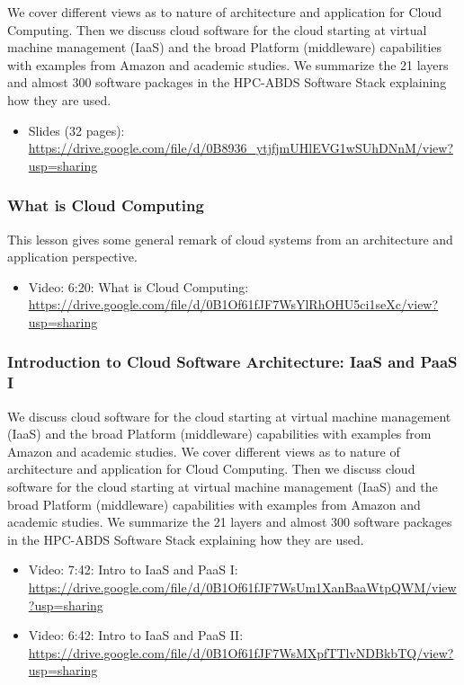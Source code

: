 We cover different views as to nature of architecture and application
for Cloud Computing. Then we discuss cloud software for the cloud
starting at virtual machine management (IaaS) and the broad Platform
(middleware) capabilities with examples from Amazon and academic
studies. We summarize the 21 layers and almost 300 software packages in
the HPC-ABDS Software Stack explaining how they are used.

\begin{itemize}
\item
  Slides (32 pages):
  \url{https://drive.google.com/file/d/0B8936_ytjfjmUHlEVG1wSUhDNnM/view?usp=sharing}
\end{itemize}

\subsubsection{What is Cloud Computing}\label{what-is-cloud-computing}

This lesson gives some general remark of cloud systems from an
architecture and application perspective.

\begin{itemize}
\tightlist
\item
  Video: 6:20: What is Cloud Computing:
  \url{https://drive.google.com/file/d/0B1Of61fJF7WsYlRhOHU5ci1seXc/view?usp=sharing}
\end{itemize}

\subsubsection{Introduction to Cloud Software Architecture: IaaS and  PaaS I}

We discuss cloud software for the cloud starting at virtual machine
management (IaaS) and the broad Platform (middleware) capabilities with
examples from Amazon and academic studies. We cover different views as
to nature of architecture and application for Cloud Computing. Then we
discuss cloud software for the cloud starting at virtual machine
management (IaaS) and the broad Platform (middleware) capabilities with
examples from Amazon and academic studies. We summarize the 21 layers
and almost 300 software packages in the HPC-ABDS Software Stack
explaining how they are used.

\begin{itemize}
\item
  Video: 7:42: Intro to IaaS and PaaS I:
  \url{https://drive.google.com/file/d/0B1Of61fJF7WsUm1XanBaaWtpQWM/view?usp=sharing}
\item
  Video: 6:42: Intro to IaaS and PaaS II:
  \url{https://drive.google.com/file/d/0B1Of61fJF7WsMXpfTTlvNDBkbTQ/view?usp=sharing}
\end{itemize}

